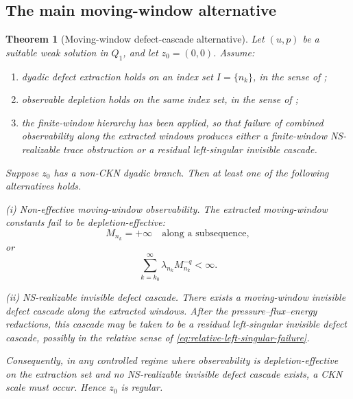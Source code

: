 \documentclass[11pt]{article}
\numberwithin{equation}{section}
\theoremstyle{plain}
\newtheorem{theorem}{Theorem}[section]
\theoremstyle{definition}
\theoremstyle{remark}
\begin{document}
\subsection{The main moving-window alternative}

\begin{theorem}[Moving-window defect-cascade alternative]
\label{thm:moving-window-defect-cascade-alternative}
Let \((u,p)\) be a suitable weak solution in \(Q_1\), and let \(z_0=(0,0)\).
Assume:
\begin{enumerate}
\item dyadic defect extraction holds on an index set \(I=\{n_k\}\), in the sense
of ;
\item observable depletion holds on the same index set, in the sense of
;
\item the finite-window hierarchy has been applied, so that failure of combined
observability along the extracted windows produces either a finite-window
NS-realizable trace obstruction or a residual left-singular invisible cascade.
\end{enumerate}
Suppose \(z_0\) has a non-CKN dyadic branch.  Then at least one of the following
alternatives holds.

\smallskip
\noindent\textup{(i) Non-effective moving-window observability.}
The extracted moving-window constants fail to be depletion-effective:
\[
        M_{n_k}=+\infty\quad\text{along a subsequence},
\]
or
\begin{equation}
        \sum_{k=k_0}^{\infty}\lambda_{n_k}M_{n_k}^{-q}<\infty.
        \label{eq:noneffective-observability-alt}
\end{equation}

\smallskip
\noindent\textup{(ii) NS-realizable invisible defect cascade.}
There exists a moving-window invisible defect cascade along the extracted
windows.  After the pressure--flux--energy reductions, this cascade may be taken
to be a residual left-singular invisible defect cascade, possibly in the
relative sense of \eqref{eq:relative-left-singular-failure}.

Consequently, in any controlled regime where observability is
depletion-effective on the extraction set and no NS-realizable invisible defect
cascade exists, a CKN scale must occur.  Hence \(z_0\) is regular.
\end{theorem}
\end{document}

